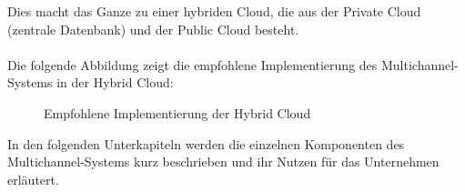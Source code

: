 Dies macht das Ganze zu einer hybriden Cloud, die aus der Private Cloud (zentrale Datenbank) und der Public Cloud besteht.\\
\\
Die folgende Abbildung zeigt die empfohlene Implementierung des Multichannel-Systems in der Hybrid Cloud:
\begin{figure}[H]
\centering
\begin{minipage}[t]{0.8\textwidth}
\caption{Empfohlene Implementierung der Hybrid Cloud} %
\label{img:Cloud_Implementierung}
\end{minipage}
\end{figure}
In den folgenden Unterkapiteln werden die einzelnen Komponenten des Multichannel-Systems kurz beschrieben und ihr Nutzen für das Unternehmen erläutert.
